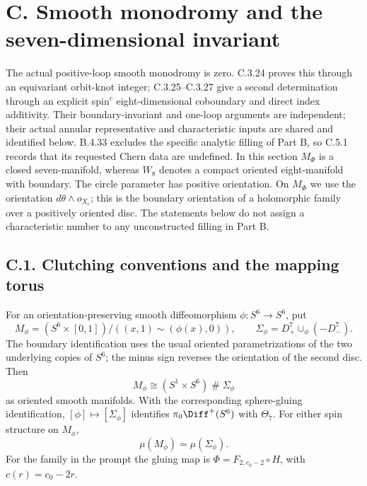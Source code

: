 \section{C. Smooth monodromy and the seven-dimensional invariant}

The actual positive-loop smooth monodromy is zero. C.3.24 proves
this through an equivariant orbit-knot integer; C.3.25--C.3.27
give a second determination through an explicit spin$^c$
eight-dimensional coboundary and direct index additivity. Their
boundary-invariant and one-loop arguments are independent; their
actual annular representative and characteristic inputs are shared
and identified below. B.4.33 excludes the specific analytic
filling of Part B, so C.5.1 records that its requested Chern
data are undefined. In this section $M_\Phi$ is a closed seven-manifold,
whereas $W_8$ denotes a
compact oriented eight-manifold with boundary. The circle parameter
has positive orientation. On $M_\Phi$ we use the orientation
$d\theta\wedge o_{X_c}$; this is the boundary orientation of a
holomorphic family over a positively oriented disc. The statements
below do not assign a characteristic number to any unconstructed
filling in Part B.

\subsection{C.1. Clutching conventions and the mapping torus}

\begin{proposition}
For an orientation-preserving smooth diffeomorphism
$\phi:S^6\to S^6$, put
\[
 M_\phi=(S^6\times[0,1])/((x,1)\sim(\phi(x),0)),\qquad
 \Sigma_\phi=D^7_+\cup_\phi(-D^7_-).
\]
The boundary identification uses the usual oriented parametrizations
of the two underlying copies of $S^6$; the minus sign reverses the
orientation of the second disc. Then
\[
 M_\phi\cong (S^1\times S^6)\mathbin\#\Sigma_\phi
\]
as oriented smooth manifolds. With the corresponding sphere-gluing
identification, $[\phi]\mapsto[\Sigma_\phi]$ identifies
$\pi_0\Diff^+(S^6)$ with $\Theta_7$. For either spin structure on
$M_\phi$,
\[
 \mu(M_\phi)=\mu(\Sigma_\phi).
\]
For the family in the prompt the gluing map is
$\Phi=F_{2,c_0-2}\circ H$, with $c(r)=c_0-2r$.
\end{proposition}

